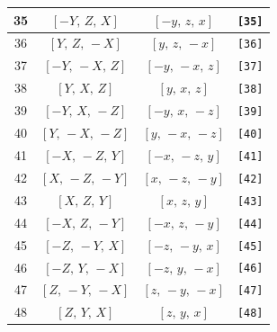 \documentclass[fleqn,8pt]{jsarticle}
\begin{document}
\begin{longtable}{cccc}
35 & $\left[ - Y,\, Z,\, X \right]$ & $\left[ - y,\, z,\, x \right]$ & {\tt [35]} \\ \hline
36 & $\left[ Y,\, Z,\, - X \right]$ & $\left[ y,\, z,\, - x \right]$ & {\tt [36]} \\ \hline
37 & $\left[ - Y,\, - X,\, Z \right]$ & $\left[ - y,\, - x,\, z \right]$ & {\tt [37]} \\ \hline
38 & $\left[ Y,\, X,\, Z \right]$ & $\left[ y,\, x,\, z \right]$ & {\tt [38]} \\ \hline
39 & $\left[ - Y,\, X,\, - Z \right]$ & $\left[ - y,\, x,\, - z \right]$ & {\tt [39]} \\ \hline
40 & $\left[ Y,\, - X,\, - Z \right]$ & $\left[ y,\, - x,\, - z \right]$ & {\tt [40]} \\ \hline
41 & $\left[ - X,\, - Z,\, Y \right]$ & $\left[ - x,\, - z,\, y \right]$ & {\tt [41]} \\ \hline
42 & $\left[ X,\, - Z,\, - Y \right]$ & $\left[ x,\, - z,\, - y \right]$ & {\tt [42]} \\ \hline
43 & $\left[ X,\, Z,\, Y \right]$ & $\left[ x,\, z,\, y \right]$ & {\tt [43]} \\ \hline
44 & $\left[ - X,\, Z,\, - Y \right]$ & $\left[ - x,\, z,\, - y \right]$ & {\tt [44]} \\ \hline
45 & $\left[ - Z,\, - Y,\, X \right]$ & $\left[ - z,\, - y,\, x \right]$ & {\tt [45]} \\ \hline
46 & $\left[ - Z,\, Y,\, - X \right]$ & $\left[ - z,\, y,\, - x \right]$ & {\tt [46]} \\ \hline
47 & $\left[ Z,\, - Y,\, - X \right]$ & $\left[ z,\, - y,\, - x \right]$ & {\tt [47]} \\ \hline
48 & $\left[ Z,\, Y,\, X \right]$ & $\left[ z,\, y,\, x \right]$ & {\tt [48]} \\
\end{longtable}
\end{document}
